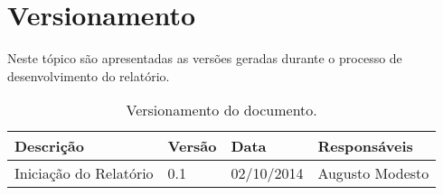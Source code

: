 \chapter[Versionamento]{Versionamento}
\label{chap:versionamento}
	Neste tópico são apresentadas as versões geradas durante o processo de desenvolvimento do relatório.
	
	\label{subsubsec:versionamento_talbe}
		\begin{table}[h]
			\centering
			\begin{tabular}{|p{6cm}|p{1.5cm}|p{2.5cm}|p{4cm}|}
				
				\hline
				
				Descrição & Versão & Data & Responsáveis \\ \hline
				Iniciação do Relatório & 0.1 & 02/10/2014 & Augusto Modesto \\ \hline
				
			\end{tabular}
			\caption[Versionamento do Documento]{Versionamento do documento.}
			\label{tab:versionamento_tabl}
		\end{table}
